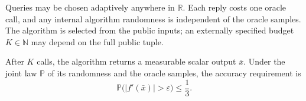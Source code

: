 \documentclass[10pt]{article}
\theoremstyle{definition}
\begin{document}
Queries may be chosen adaptively anywhere in $\mathbb{R}$. Each reply costs one oracle call, and any internal algorithm randomness is independent of the oracle samples. The algorithm is selected from the public inputs; an externally specified budget $K\in\mathbb{N}$ may depend on the full public tuple.

After $K$ calls, the algorithm returns a measurable scalar output $\bar{x}$. Under the joint law $\mathbb{P}$ of its randomness and the oracle samples, the accuracy requirement is
\[
\mathbb{P}\bigl(|f'(\bar{x})|>\varepsilon\bigr)\leq\frac{1}{3}.
\]
\end{document}

